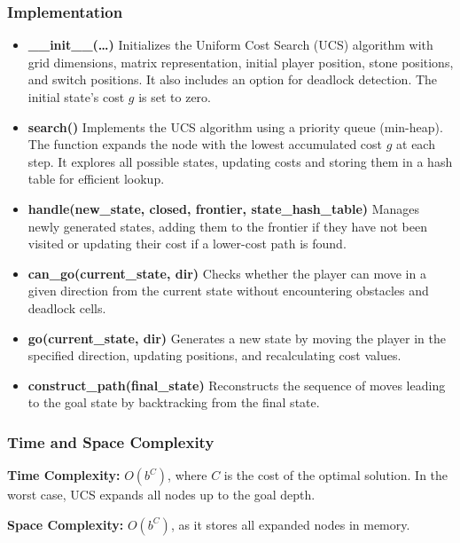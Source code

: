 \subsubsection{Implementation}
\begin{itemize}
	\item \textbf{\_\_init\_\_(\ldots)}
	      Initializes the Uniform Cost Search (UCS) algorithm with grid dimensions, matrix representation, initial player position, stone positions, and switch positions. It also includes an option for deadlock detection. The initial state's cost \( g \) is set to zero.

	\item \textbf{search()}
	      Implements the UCS algorithm using a priority queue (min-heap). The function expands the node with the lowest accumulated cost \( g \) at each step. It explores all possible states, updating costs and storing them in a hash table for efficient lookup.

	\item \textbf{handle(new\_state, closed, frontier, state\_hash\_table)}
	      Manages newly generated states, adding them to the frontier if they have not been visited or updating their cost if a lower-cost path is found.

	\item \textbf{can\_go(current\_state, dir)}
	      Checks whether the player can move in a given direction from the current state without encountering obstacles and deadlock cells.

	\item \textbf{go(current\_state, dir)}
	      Generates a new state by moving the player in the specified direction, updating positions, and recalculating cost values.

	\item \textbf{construct\_path(final\_state)}
	      Reconstructs the sequence of moves leading to the goal state by backtracking from the final state.
\end{itemize}

\subsubsection{Time and Space Complexity}
\textbf{Time Complexity:} \( O(b^C) \), where \( C \) is the cost of the optimal solution. In the worst case, UCS expands all nodes up to the goal depth.

\textbf{Space Complexity:} \( O(b^C) \), as it stores all expanded nodes in memory.
